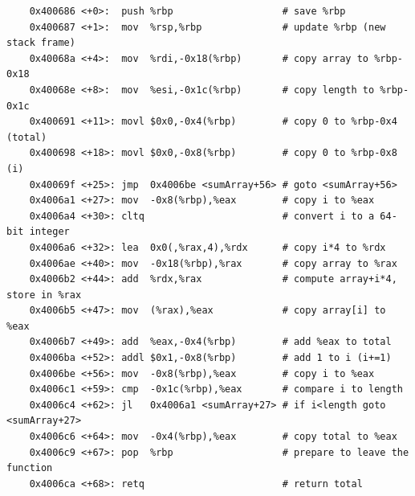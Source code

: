   \begin{lstlisting}
    0x400686 <+0>:	push %rbp                   # save %rbp
    0x400687 <+1>:	mov  %rsp,%rbp              # update %rbp (new stack frame)
    0x40068a <+4>:	mov  %rdi,-0x18(%rbp)       # copy array to %rbp-0x18
    0x40068e <+8>:	mov  %esi,-0x1c(%rbp)       # copy length to %rbp-0x1c
    0x400691 <+11>:	movl $0x0,-0x4(%rbp)        # copy 0 to %rbp-0x4 (total)
    0x400698 <+18>:	movl $0x0,-0x8(%rbp)        # copy 0 to %rbp-0x8 (i)
    0x40069f <+25>:	jmp  0x4006be <sumArray+56> # goto <sumArray+56>
    0x4006a1 <+27>:	mov  -0x8(%rbp),%eax        # copy i to %eax
    0x4006a4 <+30>:	cltq                        # convert i to a 64-bit integer
    0x4006a6 <+32>:	lea  0x0(,%rax,4),%rdx      # copy i*4 to %rdx
    0x4006ae <+40>:	mov  -0x18(%rbp),%rax       # copy array to %rax
    0x4006b2 <+44>:	add  %rdx,%rax              # compute array+i*4, store in %rax
    0x4006b5 <+47>:	mov  (%rax),%eax            # copy array[i] to %eax
    0x4006b7 <+49>:	add  %eax,-0x4(%rbp)        # add %eax to total
    0x4006ba <+52>:	addl $0x1,-0x8(%rbp)        # add 1 to i (i+=1)
    0x4006be <+56>:	mov  -0x8(%rbp),%eax        # copy i to %eax
    0x4006c1 <+59>:	cmp  -0x1c(%rbp),%eax       # compare i to length
    0x4006c4 <+62>:	jl   0x4006a1 <sumArray+27> # if i<length goto <sumArray+27>
    0x4006c6 <+64>:	mov  -0x4(%rbp),%eax        # copy total to %eax
    0x4006c9 <+67>:	pop  %rbp                   # prepare to leave the function
    0x4006ca <+68>:	retq                        # return total
  \end{lstlisting}

